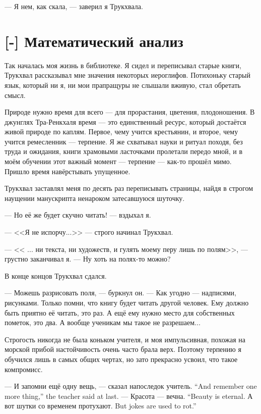 --- Я нем, как скала, --- заверил я Трукхвала.

\section{[-] Математический анализ}

Так началась моя жизнь в библиотеке.
Я сидел и переписывал старые книги, Трукхвал рассказывал мне значения некоторых иероглифов.
Потихоньку старый язык, который ни я, ни мои прапращуры не слышали вживую, стал обретать смысл.

Природе нужно время для всего --- для прорастания, цветения, плодоношения.
В джунглях Тра-Ренкхаля время --- это единственный ресурс, который достаётся живой природе по каплям.
Первое, чему учится крестьянин, и второе, чему учится ремесленник --- терпение.
Я же схватывал науки и ритуал походя, без труда и ожидания, книги храмовыми ласточками пролетали передо мной, и в моём обучении этот важный момент --- терпение --- как-то прошёл мимо.
Пришло время навёрстывать упущенное.

Трукхвал заставлял меня по десять раз переписывать страницы, найдя в строгом наущении манускрипта ненароком затесавшуюся шуточку.

--- Но её же будет скучно читать! --- вздыхал я.

--- <<Я не испорчу...>> --- строго начинал Трукхвал.

--- << ... ни текста, ни художеств, и гулять моему перу лишь по полям>>, --- грустно заканчивал я.
--- Ну хоть на полях-то можно?

В конце концов Трукхвал сдался.

--- Можешь разрисовать поля, --- буркнул он.
--- Как угодно --- надписями, рисунками.
Только помни, что книгу будет читать другой человек.
Ему должно быть приятно её читать, это раз.
А ещё ему нужно место для собственных пометок, это два.
А вообще ученикам мы такое не разрешаем...

Строгость никогда не была коньком учителя, и моя импульсивная, похожая на морской прибой настойчивость очень часто брала верх.
Поэтому терпению я обучился лишь в самых общих чертах, но зато прекрасно усвоил, что такое компромисс.

{--- И запомни ещё одну вещь, --- сказал напоследок учитель.}
{``And remember one more thing,'' the teacher said at last.}
{--- Красота --- вечна.}
{``Beauty is eternal.}
{А вот шутки со временем протухают.}
{But jokes are used to rot.''}


